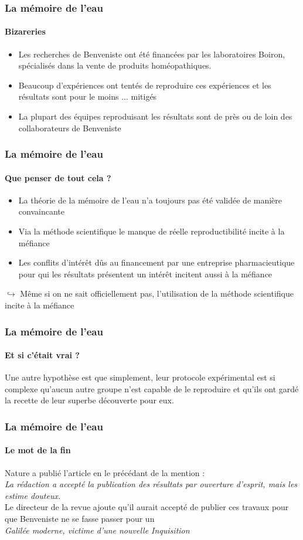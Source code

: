 \documentclass[11pt]{beamer}
\begin{document}
\begin{frame}
\frametitle{La mémoire de l'eau}
\framesubtitle{Bizareries}
\begin{itemize}
	\item Les recherches de Benveniste ont été financées par les laboratoires Boiron, spécialisés dans la vente de produits homéopathiques. 
	\item Beaucoup d'expériences ont tentés de reproduire ces expériences et les résultats sont pour le moins ... mitigés
	\item  La plupart des équipes reproduisant les résultats sont de près ou de loin des collaborateurs de Benveniste
\end{itemize}
\end{frame}
\begin{frame}
\frametitle{La mémoire de l'eau}
\framesubtitle{Que penser de tout cela ?}
\begin{itemize}
	\item La théorie de la mémoire de l'eau n'a toujours pas été validée de manière convaincante
	\item Via la méthode scientifique le manque de réelle reproductibilité incite à la méfiance
	\item Les conflits d'intérêt dûs au financement par une entreprise pharmacieutique pour qui les résultats présentent un intérêt incitent aussi à la méfiance
\end{itemize}
\pause $\hookrightarrow$ Même si on ne sait officiellement pas, l'utilisation de la méthode scientifique incite à la méfiance
\end{frame}
\begin{frame}
\frametitle{La mémoire de l'eau}
\framesubtitle{Et si c'était vrai ?}
Une autre hypothèse est que simplement, leur protocole expérimental est si complexe qu'aucun autre groupe n'est capable de le reproduire et qu'ils ont gardé la recette de leur superbe découverte pour eux.

\end{frame}
\begin{frame}
\frametitle{La mémoire de l'eau}
\framesubtitle{Le mot de la fin}
 Nature a publié l’article en le précédant de la mention : 
 \\ \textit{La rédaction a accepté la publication des résultats par ouverture d’esprit, mais les estime douteux.} 
 \\ \pause
 Le directeur de la revue ajoute qu'il aurait accepté de publier ces travaux pour que Benveniste  ne se fasse passer pour un \\ \textit{Galilée moderne, victime d’une nouvelle Inquisition}
\end{frame}
\end{document}
